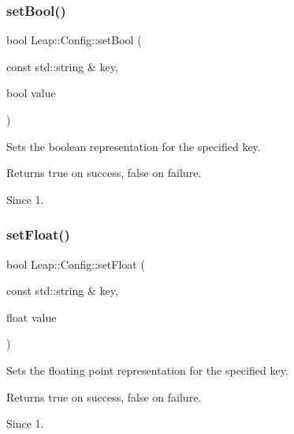 \subsubsection{\texorpdfstring{set\+Bool()}{setBool()}}
{\footnotesize\ttfamily bool Leap\+::\+Config\+::set\+Bool (\begin{DoxyParamCaption}\item[{const std\+::string \&}]{key,  }\item[{bool}]{value }\end{DoxyParamCaption})\hspace{0.3cm}{\ttfamily [inline]}}

Sets the boolean representation for the specified key.


\begin{DoxyCodeInclude}
\end{DoxyCodeInclude}


\begin{DoxyReturn}{Returns}
true on success, false on failure. 
\end{DoxyReturn}
\begin{DoxySince}{Since}
1. 
\end{DoxySince}
\mbox{\label{class_leap_1_1_config_a67112a0e19a0fd8d9844a2c3824a187e}} 
\subsubsection{\texorpdfstring{set\+Float()}{setFloat()}}
{\footnotesize\ttfamily bool Leap\+::\+Config\+::set\+Float (\begin{DoxyParamCaption}\item[{const std\+::string \&}]{key,  }\item[{float}]{value }\end{DoxyParamCaption})\hspace{0.3cm}{\ttfamily [inline]}}

Sets the floating point representation for the specified key.


\begin{DoxyCodeInclude}
\end{DoxyCodeInclude}


\begin{DoxyReturn}{Returns}
true on success, false on failure. 
\end{DoxyReturn}
\begin{DoxySince}{Since}
1. 
\end{DoxySince}
\mbox{\label{class_leap_1_1_config_ab7d1ab1b142d9a14b83f1342844d39e8}} 
